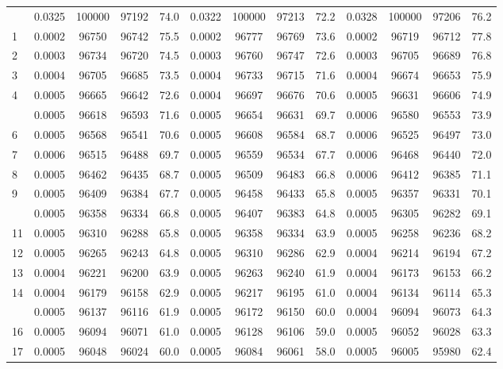 \documentclass[
  14pt,
]{article}
\begin{document}
\begin{longtable}[t]{lcccccccccccc}
\endfoot
\bottomrule
\endlastfoot
0 & 0.0325 & 100000 & 97192 & 74.0 & 0.0322 & 100000 & 97213 & 72.2 & 0.0328 & 100000 & 97206 & 76.2\\
1 & 0.0002 & 96750 & 96742 & 75.5 & 0.0002 & 96777 & 96769 & 73.6 & 0.0002 & 96719 & 96712 & 77.8\\
2 & 0.0003 & 96734 & 96720 & 74.5 & 0.0003 & 96760 & 96747 & 72.6 & 0.0003 & 96705 & 96689 & 76.8\\
3 & 0.0004 & 96705 & 96685 & 73.5 & 0.0004 & 96733 & 96715 & 71.6 & 0.0004 & 96674 & 96653 & 75.9\\
4 & 0.0005 & 96665 & 96642 & 72.6 & 0.0004 & 96697 & 96676 & 70.6 & 0.0005 & 96631 & 96606 & 74.9\\
\addlinespace
5 & 0.0005 & 96618 & 96593 & 71.6 & 0.0005 & 96654 & 96631 & 69.7 & 0.0006 & 96580 & 96553 & 73.9\\
6 & 0.0005 & 96568 & 96541 & 70.6 & 0.0005 & 96608 & 96584 & 68.7 & 0.0006 & 96525 & 96497 & 73.0\\
7 & 0.0006 & 96515 & 96488 & 69.7 & 0.0005 & 96559 & 96534 & 67.7 & 0.0006 & 96468 & 96440 & 72.0\\
8 & 0.0005 & 96462 & 96435 & 68.7 & 0.0005 & 96509 & 96483 & 66.8 & 0.0006 & 96412 & 96385 & 71.1\\
9 & 0.0005 & 96409 & 96384 & 67.7 & 0.0005 & 96458 & 96433 & 65.8 & 0.0005 & 96357 & 96331 & 70.1\\
\addlinespace
10 & 0.0005 & 96358 & 96334 & 66.8 & 0.0005 & 96407 & 96383 & 64.8 & 0.0005 & 96305 & 96282 & 69.1\\
11 & 0.0005 & 96310 & 96288 & 65.8 & 0.0005 & 96358 & 96334 & 63.9 & 0.0005 & 96258 & 96236 & 68.2\\
12 & 0.0005 & 96265 & 96243 & 64.8 & 0.0005 & 96310 & 96286 & 62.9 & 0.0004 & 96214 & 96194 & 67.2\\
13 & 0.0004 & 96221 & 96200 & 63.9 & 0.0005 & 96263 & 96240 & 61.9 & 0.0004 & 96173 & 96153 & 66.2\\
14 & 0.0004 & 96179 & 96158 & 62.9 & 0.0005 & 96217 & 96195 & 61.0 & 0.0004 & 96134 & 96114 & 65.3\\
\addlinespace
15 & 0.0005 & 96137 & 96116 & 61.9 & 0.0005 & 96172 & 96150 & 60.0 & 0.0004 & 96094 & 96073 & 64.3\\
16 & 0.0005 & 96094 & 96071 & 61.0 & 0.0005 & 96128 & 96106 & 59.0 & 0.0005 & 96052 & 96028 & 63.3\\
17 & 0.0005 & 96048 & 96024 & 60.0 & 0.0005 & 96084 & 96061 & 58.0 & 0.0005 & 96005 & 95980 & 62.4\\

\end{longtable}
\end{document}
